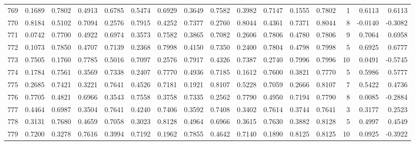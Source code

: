 \begin{tabular}{lrrrrrrrrrrrrrrr}
769 &      0.1689 &  0.7802 &  0.4913 &  0.6785 &  0.5474 &  0.6929 &  0.3649 &  0.7582 &  0.3982 &  0.7147 &   0.1555 &     0.7802 &      1 &                    0.6113 &                     0.6113 \\
770 &      0.8184 &  0.5102 &  0.7094 &  0.2576 &  0.7915 &  0.4252 &  0.7377 &  0.2760 &  0.8044 &  0.4361 &   0.7371 &     0.8044 &      8 &                   -0.0140 &                    -0.3082 \\
771 &      0.0742 &  0.7700 &  0.4922 &  0.6974 &  0.3573 &  0.7582 &  0.3865 &  0.7082 &  0.2606 &  0.7806 &   0.4780 &     0.7806 &      9 &                    0.7064 &                     0.6958 \\
772 &      0.1073 &  0.7850 &  0.4707 &  0.7139 &  0.2368 &  0.7998 &  0.4150 &  0.7350 &  0.2400 &  0.7804 &   0.4798 &     0.7998 &      5 &                    0.6925 &                     0.6777 \\
773 &      0.7505 &  0.1760 &  0.7785 &  0.5016 &  0.7097 &  0.2576 &  0.7917 &  0.4326 &  0.7387 &  0.2740 &   0.7996 &     0.7996 &     10 &                    0.0491 &                    -0.5745 \\
774 &      0.1784 &  0.7561 &  0.3569 &  0.7338 &  0.2407 &  0.7770 &  0.4936 &  0.7185 &  0.1612 &  0.7600 &   0.3821 &     0.7770 &      5 &                    0.5986 &                     0.5777 \\
775 &      0.2685 &  0.7421 &  0.3221 &  0.7641 &  0.4526 &  0.7181 &  0.1921 &  0.8107 &  0.5228 &  0.7059 &   0.2666 &     0.8107 &      7 &                    0.5422 &                     0.4736 \\
776 &      0.7705 &  0.4821 &  0.6966 &  0.3543 &  0.7558 &  0.3758 &  0.7335 &  0.2562 &  0.7790 &  0.4950 &   0.7194 &     0.7790 &      8 &                    0.0085 &                    -0.2884 \\
777 &      0.4464 &  0.6987 &  0.3504 &  0.7641 &  0.4240 &  0.7406 &  0.3592 &  0.7408 &  0.3402 &  0.7614 &   0.3744 &     0.7641 &      3 &                    0.3177 &                     0.2523 \\
778 &      0.3131 &  0.7680 &  0.4659 &  0.7058 &  0.3023 &  0.8128 &  0.4964 &  0.6966 &  0.3615 &  0.7630 &   0.3882 &     0.8128 &      5 &                    0.4997 &                     0.4549 \\
779 &      0.7200 &  0.3278 &  0.7616 &  0.3994 &  0.7192 &  0.1962 &  0.7855 &  0.4642 &  0.7140 &  0.1890 &   0.8125 &     0.8125 &     10 &                    0.0925 &                    -0.3922 \\

\end{tabular}
